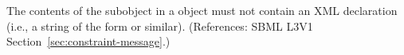 The contents of the \Message subobject in a \Constraint object must not
contain an XML declaration (i.e., a string of the form  or similar).  (References: SBML L3V1
Section~\ref{sec:constraint-message}.)
